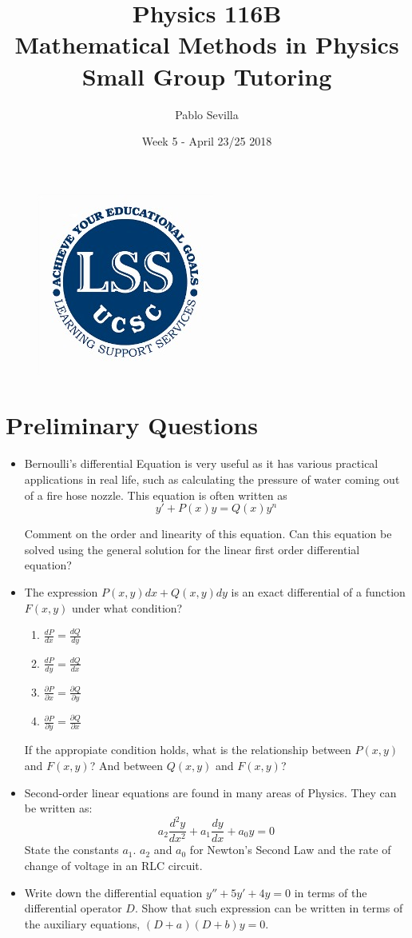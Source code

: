 \documentclass{article}
\title{Physics 116B \\ Mathematical Methods in Physics\\ Small Group Tutoring}
\author{Pablo Sevilla}
\date{Week 5 - April 23/25 2018}
\begin{document}
\maketitle

\begin{figure}[h]
\centering
\includegraphics[scale=0.3]{lss}
\end{figure}
\section{Preliminary Questions}
 \begin{itemize}
  \item Bernoulli's differential Equation is very useful as it has various practical applications in real life, such as calculating the pressure of water coming out of a fire hose nozzle. This equation is often written as 
  \begin{equation}
      y'+P(x)y=Q(x)y^n
  \end{equation} 
  
  Comment on the order and linearity of this equation. Can this equation be solved using the general solution for the linear first order differential equation?
  \item The expression $P(x,y)dx+Q(x,y)dy$ is an exact differential of a function $F(x,y)$ under what condition? 
\begin{enumerate}[label=(\alph*)]
\centering
\item $\frac{dP}{dx}=\frac{dQ}{dy}$
\item $\frac{dP}{dy}=\frac{dQ}{dx}$
\item $\frac{\partial P}{\partial x}=\frac{\partial Q}{\partial y}$
\item $\frac{\partial P}{\partial y}=\frac{\partial Q}{\partial x}$
\end{enumerate}
If the appropiate condition holds, what is the relationship between $P(x,y)$ and $F(x,y)$? And between $Q(x,y)$ and $F(x,y)$?
\item Second-order linear equations are found in many areas of Physics. They can be written as:
\begin{equation}
    a_2\frac{d^2y}{dx^2}+a_1\frac{dy}{dx}+a_0y=0
\end{equation}
State the constants $a_1$. $a_2$ and $a_0$ for Newton's Second Law and the rate of change of voltage in an RLC circuit.
\item Write down the differential equation $y''+5y'+4y=0$ in terms of the differential operator $D$. Show that such expression can be written in terms of the auxiliary equations, $(D+a)(D+b)y=0$.
 \end{itemize}
  
\end{document}
